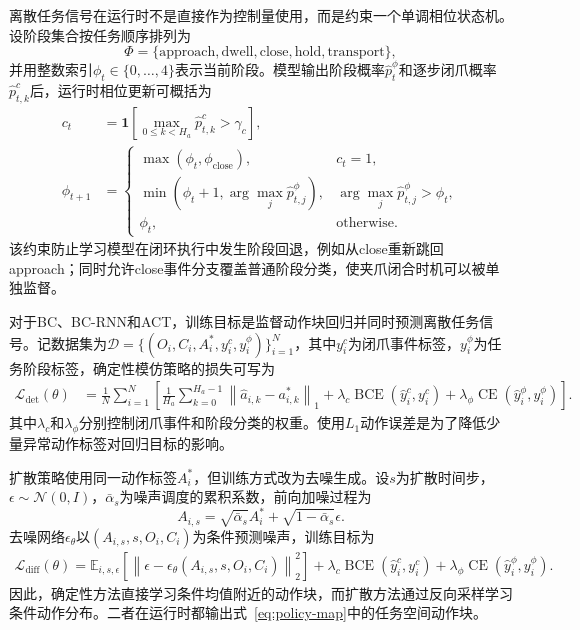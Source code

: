 离散任务信号在运行时不是直接作为控制量使用，而是约束一个单调相位状态机。设阶段集合按任务顺序排列为
\begin{equation}
    \Phi=\{\mathrm{approach},\mathrm{dwell},\mathrm{close},\mathrm{hold},\mathrm{transport}\},
    \label{eq:phase-set}
\end{equation}
并用整数索引$\phi_t\in\{0,\ldots,4\}$表示当前阶段。模型输出阶段概率$\hat{p}^\phi_t$和逐步闭爪概率$\hat{p}^c_{t,k}$后，运行时相位更新可概括为
\begin{align}
    c_t &= \mathbf{1}\left[\max_{0\leq k<H_a}\hat{p}^c_{t,k}>\gamma_c\right],\\
    \phi_{t+1} &=
    \begin{cases}
        \max(\phi_t,\phi_{\mathrm{close}}), & c_t=1,\\
        \min\left(\phi_t+1,\arg\max_j \hat{p}^\phi_{t,j}\right), & \arg\max_j \hat{p}^\phi_{t,j}>\phi_t,\\
        \phi_t, & \text{otherwise}.
    \end{cases}
    \label{eq:phase-fsm}
\end{align}
该约束防止学习模型在闭环执行中发生阶段回退，例如从close重新跳回approach；同时允许close事件分支覆盖普通阶段分类，使夹爪闭合时机可以被单独监督。

对于BC、BC-RNN和ACT，训练目标是监督动作块回归并同时预测离散任务信号。记数据集为$\mathcal{D}=\{(O_i,C_i,A_i^*,y_i^c,y_i^\phi)\}_{i=1}^{N}$，其中$y_i^c$为闭爪事件标签，$y_i^\phi$为任务阶段标签，确定性模仿策略的损失可写为
\begin{align}
    \mathcal{L}_{\mathrm{det}}(\theta)
    &= \frac{1}{N}\sum_{i=1}^{N}
    \left[
        \frac{1}{H_a}\sum_{k=0}^{H_a-1}
        \left\|\hat{a}_{i,k}-a^*_{i,k}\right\|_1
        + \lambda_c\operatorname{BCE}(\hat{y}^c_i,y^c_i)
        + \lambda_\phi\operatorname{CE}(\hat{y}^\phi_i,y^\phi_i)
    \right].
    \label{eq:deterministic-loss}
\end{align}
其中$\lambda_c$和$\lambda_\phi$分别控制闭爪事件和阶段分类的权重。使用$L_1$动作误差是为了降低少量异常动作标签对回归目标的影响。

扩散策略使用同一动作标签$A_i^*$，但训练方式改为去噪生成\citep{ho2020denoising,chi2023diffusion}。设$s$为扩散时间步，$\epsilon\sim\mathcal{N}(0,I)$，$\bar{\alpha}_s$为噪声调度的累积系数，前向加噪过程为
\begin{equation}
    A_{i,s}=\sqrt{\bar{\alpha}_s}A_i^*+\sqrt{1-\bar{\alpha}_s}\epsilon.
    \label{eq:diffusion-forward}
\end{equation}
去噪网络$\epsilon_\theta$以$(A_{i,s},s,O_i,C_i)$为条件预测噪声，训练目标为
\begin{align}
    \mathcal{L}_{\mathrm{diff}}(\theta)
    =\mathbb{E}_{i,s,\epsilon}\left[
        \left\|\epsilon-\epsilon_\theta(A_{i,s},s,O_i,C_i)\right\|_2^2
    \right]
    +\lambda_c\operatorname{BCE}(\hat{y}^c_i,y^c_i)
    +\lambda_\phi\operatorname{CE}(\hat{y}^\phi_i,y^\phi_i).
    \label{eq:diffusion-loss}
\end{align}
因此，确定性方法直接学习条件均值附近的动作块，而扩散方法通过反向采样学习条件动作分布。二者在运行时都输出式~\eqref{eq:policy-map}中的任务空间动作块。

